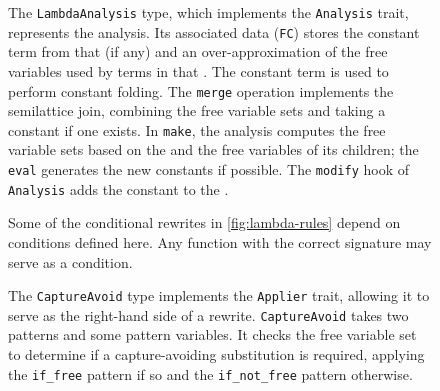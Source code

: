 \begin{figure}
{The \texttt{LambdaAnalysis} type, which implements the \texttt{Analysis} trait,
  represents the \eclass analysis.
Its associated data (\texttt{FC}) stores
  the constant term from that \eclass (if any) and
  an over-approximation of the free variables used by terms in that \eclass.
The constant term is used to perform constant folding.
The \texttt{merge} operation implements the semilattice join, combining the free
  variable sets and taking a constant if one exists.
In \texttt{make}, the analysis computes the free variable sets based on the
  \enode and the free variables of its children;
  the \texttt{eval} generates the new constants if possible.
The \texttt{modify} hook of \texttt{Analysis} adds the constant to the \egraph.

Some of the conditional rewrites in \autoref{fig:lambda-rules} depend on
  conditions defined here.
Any function with the correct signature may serve as a condition.

The \texttt{CaptureAvoid} type implements the \texttt{Applier} trait, allowing
  it to serve as the right-hand side of a rewrite.
\texttt{CaptureAvoid} takes two patterns and some pattern variables.
It checks the free variable set to determine if a capture-avoiding substitution
  is required, applying the \texttt{if\_free} pattern if so and the
  \texttt{if\_not\_free} pattern otherwise.
}
\label{fig:lambda-applier}
\label{fig:lambda-analysis}
\end{figure}


